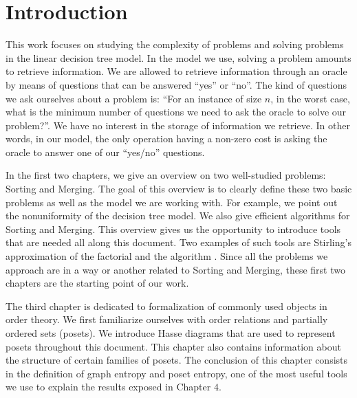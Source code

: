 \chapter*{Introduction}

This work focuses on studying the complexity of problems and solving problems
in the linear decision tree model. In the model we use, solving a problem
amounts to retrieve information. We are allowed to retrieve information
through an oracle by means of questions that
can be answered ``yes'' or ``no''. The kind of questions we ask ourselves
about a problem is: ``For an instance of size \(n\), in the worst case, what is
the minimum number of questions we need to ask the oracle to solve our
problem?''. We have no interest in the storage of information we retrieve.
In other words, in our model, the only operation having a non-zero cost is
asking the oracle to answer one of our ``yes/no'' questions.

In the first two chapters, we give an overview on two well-studied problems:
Sorting and Merging. The goal of this overview is to clearly define these two
basic problems as well as the model we are working with. For example, we point
out the nonuniformity of the decision tree model.
We also give efficient algorithms for Sorting and Merging.
This overview gives us
the opportunity to introduce tools that are needed all along this document. Two
examples of such tools are Stirling's approximation of the factorial
\cite{feller1967direct} and the \mergesort algorithm
\cite{goldstine:1948,leiserson:2001}. Since all the problems we approach are in
a way or another related to Sorting and Merging, these first two chapters are the starting
point of our work.

The third chapter is dedicated to formalization of commonly used objects
in order theory. We first familiarize ourselves with order
relations and partially ordered sets (posets). We introduce Hasse diagrams that
are used to represent posets throughout this document.
This chapter also contains information about the structure of
certain families of posets. The conclusion of this
chapter consists in the definition of graph entropy \cite{korner1973coding}
and poset entropy, one of the most useful tools we use to explain the
results exposed in Chapter \(4\).

